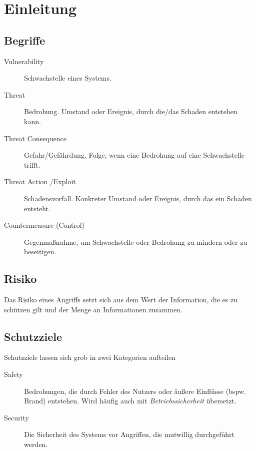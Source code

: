 \chapter{Einleitung} %
	\begin{figure}[H]
		\centering
	\end{figure}

	\section{Begriffe}
		\begin{description}
			\item[Vulnerability] Schwachstelle eines Systems.
			\item[Threat] Bedrohung. Umstand oder Ereignis, durch die/das Schaden entstehen kann.
			\item[Threat Consequence] Gefahr/Gefährdung. Folge, wenn eine Bedrohung auf eine Schwachstelle trifft.
			\item[Threat Action /Exploit] Schadensvorfall. Konkreter Umstand oder Ereignis, durch das ein Schaden entsteht.
			\item[Countermeasure (Control)] Gegenmaßnahme, um Schwachstelle oder Bedrohung zu mindern oder zu beseitigen.
		\end{description}

	\section{Risiko}
		Das Risiko eines Angriffs setzt sich aus dem Wert der Information, die es zu schützen gilt und der Menge an Informationen zusammen.

	\section{Schutzziele}
		Schutzziele lassen sich grob in zwei Kategorien aufteilen
		\begin{description}
			\item[Safety] Bedrohungen, die durch Fehler des Nutzers oder äußere Einflüsse (bspw. Brand) entstehen. Wird häufig auch mit \textit{Betriebssicherheit} übersetzt.
			\item[Security] Die Sicherheit des Systems vor Angriffen, die mutwillig durchgeführt werden.
		\end{description}

